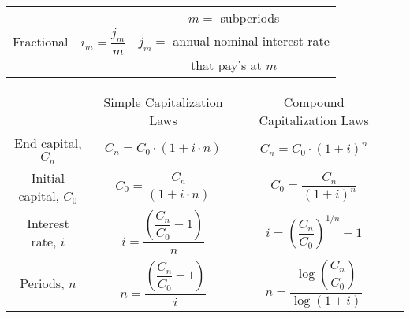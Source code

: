 \documentclass[10pt, a4paper]{extarticle}
\begin{document}
\begin{tabular}{|c|c|c||c|c|}
	\multirow{3}{*}{Fractional} &         \multicolumn{2}{c|}{\multirow{3}{*}{$i_m = \dfrac{j_m}{m}$}}          &                   \multicolumn{2}{c}{$m =$ subperiods}                    \\
	                            &                             \multicolumn{2}{c|}{}                             &         \multicolumn{2}{c}{$j_m =$ annual nominal interest rate}          \\
	                            &                             \multicolumn{2}{c|}{}                             &                   \multicolumn{2}{c}{that pay's at $m$}                   \\ \cline{1-3}
\end{tabular}

\vspace{1cm}

\setlength{\tabcolsep}{8pt}
\renewcommand{\arraystretch}{3.5}

\vspace{1cm}

\begin{tabular}{|c|c|c|c}
	\cline{2-3}
	\multicolumn{1}{c|}{}  &              Simple Capitalization Laws              &                   Compound Capitalization Laws                   & \multirow{5}{*}{\rotatebox{90}{$a^x = b \rightarrow x = \dfrac{\log b}{\log a} = \log_a b$}} \\ \cline{1-3}
	  End capital, $C_n$   &          $C_n = C_0 \cdot (1 + i \cdot n)$           &                   $C_n = C_0 \cdot (1 + i)^n$                    &                                                                                              \\ \cline{1-3}
	Initial capital, $C_0$ &         $C_0 = \dfrac{C_n}{(1 + i \cdot n)}$         &                  $C_0 = \dfrac{C_n}{(1 + i)^n}$                  &                                                                                              \\ \cline{1-3}
	  Interest rate, $i$   & $i = \dfrac{\left( \dfrac{C_n}{C_0} - 1 \right)}{n}$ &         $i = \left( \dfrac{C_n}{C_0} \right)^{1/n} - 1$          &                                                                                              \\ \cline{1-3}
	     Periods, $n$      & $n = \dfrac{\left( \dfrac{C_n}{C_0} - 1 \right)}{i}$ & $n = \dfrac{\log \left( \dfrac{C_n}{C_0} \right)}{\log (1 + i)}$ &                                                                                              \\ \cline{1-3}
\end{tabular}
\end{document}
